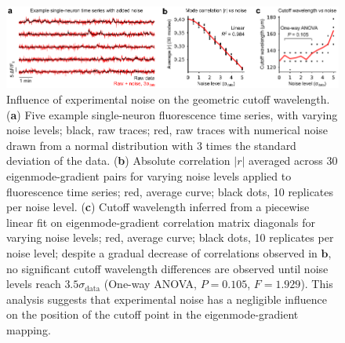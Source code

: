 \documentclass{article}
\begin{document}
\begin{figure}[t]
    \centering
    \includegraphics[width=1.0\linewidth]{figures/supp_noise.pdf}
    \caption{Influence of experimental noise on the geometric cutoff wavelength. (\textbf{a}) Five example single-neuron fluorescence time series, with varying noise levels; black, raw traces; red, raw traces with numerical noise drawn from a normal distribution with 3 times the standard deviation of the data. (\textbf{b}) Absolute correlation $|r|$ averaged across 30 eigenmode-gradient pairs for varying noise levels applied to fluorescence time series; red, average curve; black dots, 10 replicates per noise level. (\textbf{c}) Cutoff wavelength inferred from a piecewise linear fit on eigenmode-gradient correlation matrix diagonals for varying noise levels; red, average curve; black dots, 10 replicates per noise level; despite a gradual decrease of correlations observed in $\textbf{b}$, no significant cutoff wavelength differences are observed until noise levels reach $3.5\sigma_{\text{data}}$ (One-way ANOVA, $P=0.105$, $F=1.929$). This analysis suggests that experimental noise has a negligible influence on the position of the cutoff point in the eigenmode-gradient mapping.}
    \label{supp_noise}
\end{figure}

\newpage
\end{document}
